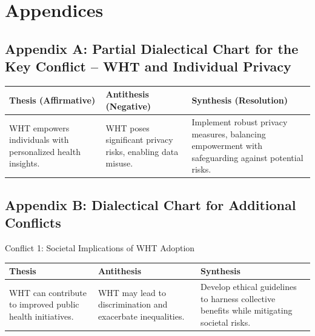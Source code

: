 \documentclass[11pt]{article}
\begin{document}
\section*{Appendices}

\subsection*{Appendix A: Partial Dialectical Chart for the Key Conflict -- WHT and Individual Privacy}

\begin{center}\small
\begin{tabularx}{\linewidth}{@{}>{\raggedright\arraybackslash}X>{\raggedright\arraybackslash}X>{\raggedright\arraybackslash}X@{}}
\toprule
Thesis (Affirmative) & Antithesis (Negative) & Synthesis (Resolution) \\
\midrule
WHT empowers individuals with personalized health insights. & WHT poses significant privacy risks, enabling data misuse. & Implement robust privacy measures, balancing empowerment with safeguarding against potential risks. \\
\bottomrule
\end{tabularx}
\end{center}

\subsection*{Appendix B: Dialectical Chart for Additional Conflicts}

\noindent Conflict 1: Societal Implications of WHT Adoption

\begin{center}\small
\begin{tabularx}{\linewidth}{@{}>{\raggedright\arraybackslash}X>{\raggedright\arraybackslash}X>{\raggedright\arraybackslash}X@{}}
\toprule
Thesis & Antithesis & Synthesis \\
\midrule
WHT can contribute to improved public health initiatives. & WHT may lead to discrimination and exacerbate inequalities. & Develop ethical guidelines to harness collective benefits while mitigating societal risks. \\
\bottomrule
\end{tabularx}
\end{center}
\end{document}
